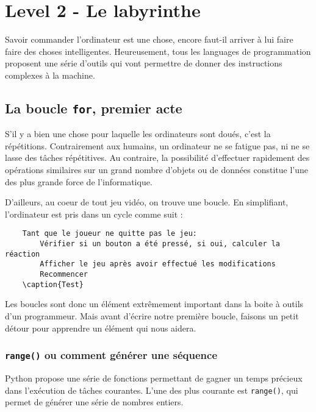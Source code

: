 \chapter{Level 2 - Le labyrinthe}

Savoir commander l'ordinateur est une chose, encore faut-il arriver à lui faire faire des choses intelligentes. Heureusement, tous les languages de programmation proposent une série d'outils qui vont permettre de donner des instructions complexes à la machine.

\section{La boucle \texttt{for}, premier acte}

S'il y a bien une chose pour laquelle les ordinateurs sont doués, c'est la répétitions. Contrairement aux humains, un ordinateur ne se fatigue pas, ni ne se lasse des tâches répétitives. Au contraire, la possibilité d'effectuer rapidement des opérations similaires sur un grand nombre d'objets ou de données constitue l'une des plus grande force de l'informatique.

D'ailleurs, au coeur de tout jeu vidéo, on trouve une boucle. En simplifiant, l'ordinateur est pris dans un cycle comme suit :

\begin{lstlisting}
    Tant que le joueur ne quitte pas le jeu:
        Vérifier si un bouton a été pressé, si oui, calculer la réaction
        Afficher le jeu après avoir effectué les modifications
        Recommencer
    \caption{Test}
\end{lstlisting}

Les boucles sont donc un élément extrêmement important dans la boite à outils d'un programmeur. Mais avant d'écrire notre première boucle, faisons un petit détour pour apprendre un élément qui nous aidera.

\subsection{\texttt{range()} ou comment générer une séquence}

Python propose une série de fonctions permettant de gagner un temps précieux dans l'exécution de tâches courantes. L'une des plus courante est \texttt{range()}, qui permet de générer une série de nombres entiers.

